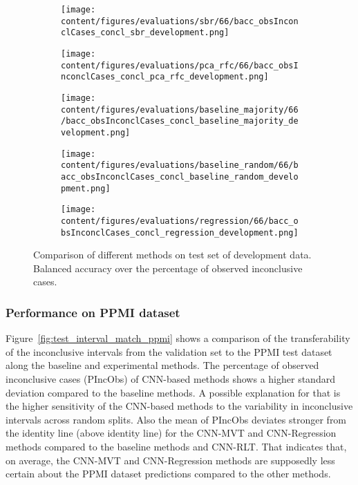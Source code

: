 \begin{figure}[ht]
  \begin{subfigure}{0.45\textwidth}
    \centering
    \texttt{[image: content/figures/evaluations/sbr/66/bacc\_obsInconclCases\_concl\_sbr\_development.png]}
  \end{subfigure}
  \hfill
  \begin{subfigure}{0.45\textwidth}
    \centering
    \texttt{[image: content/figures/evaluations/pca\_rfc/66/bacc\_obsInconclCases\_concl\_pca\_rfc\_development.png]}
  \end{subfigure}
  \hfill
  \begin{subfigure}{0.45\textwidth}
    \centering
    \texttt{[image: content/figures/evaluations/baseline\_majority/66/bacc\_obsInconclCases\_concl\_baseline\_majority\_development.png]}
  \end{subfigure}
  \hfill
  \begin{subfigure}{0.45\textwidth}
    \centering
    \texttt{[image: content/figures/evaluations/baseline\_random/66/bacc\_obsInconclCases\_concl\_baseline\_random\_development.png]}
  \end{subfigure}
  \hfill
  \begin{subfigure}{0.45\textwidth}
    \centering
    \texttt{[image: content/figures/evaluations/regression/66/bacc\_obsInconclCases\_concl\_regression\_development.png]}
  \end{subfigure}

  \caption{Comparison of different methods on test set of development data. 
  Balanced accuracy over the percentage of observed inconclusive cases.}
  \label{fig:test_dev}
\end{figure}



\subsubsection{Performance on PPMI dataset}


Figure~\ref{fig:test_interval_match_ppmi} shows a comparison of the transferability of the inconclusive intervals 
from the validation set to the PPMI test dataset along the baseline and experimental methods.
The percentage of observed inconclusive cases (PIncObs) of CNN-based methods shows a higher standard deviation 
compared to the baseline methods.
A possible explanation for that is the higher sensitivity of the CNN-based methods 
to the variability in inconclusive intervals across random splits.
Also the mean of PIncObs deviates stronger from the identity line (above identity line) 
for the CNN-MVT and CNN-Regression methods compared to the baseline methods and CNN-RLT.
That indicates that, on average, the CNN-MVT and CNN-Regression methods are supposedly less certain 
about the PPMI dataset predictions compared to the other methods.

